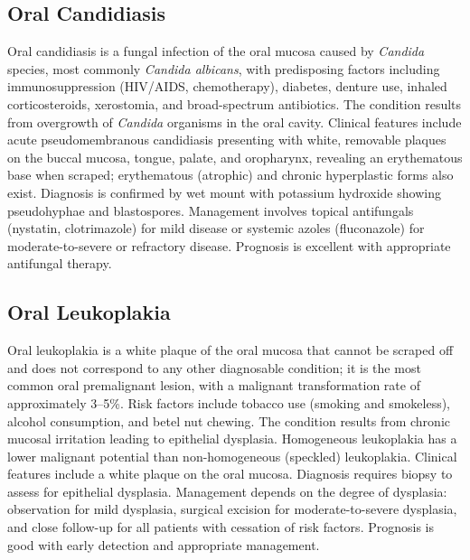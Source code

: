 \subsection{Oral Candidiasis}
\label{sec:Oral Candidiasis}
Oral candidiasis is a fungal infection of the oral mucosa caused by \textit{Candida} species, most commonly \textit{Candida albicans}, with predisposing factors including immunosuppression (HIV/AIDS, chemotherapy), diabetes, denture use, inhaled corticosteroids, xerostomia, and broad-spectrum antibiotics. The condition results from overgrowth of \textit{Candida} organisms in the oral cavity. Clinical features include acute pseudomembranous candidiasis presenting with white, removable plaques on the buccal mucosa, tongue, palate, and oropharynx, revealing an erythematous base when scraped; erythematous (atrophic) and chronic hyperplastic forms also exist. Diagnosis is confirmed by wet mount with potassium hydroxide showing pseudohyphae and blastospores. Management involves topical antifungals (nystatin, clotrimazole) for mild disease or systemic azoles (fluconazole) for moderate-to-severe or refractory disease. Prognosis is excellent with appropriate antifungal therapy.

\subsection{Oral Leukoplakia}
\label{sec:Oral Leukoplakia}
Oral leukoplakia is a white plaque of the oral mucosa that cannot be scraped off and does not correspond to any other diagnosable condition; it is the most common oral premalignant lesion, with a malignant transformation rate of approximately 3--5\%. Risk factors include tobacco use (smoking and smokeless), alcohol consumption, and betel nut chewing. The condition results from chronic mucosal irritation leading to epithelial dysplasia. Homogeneous leukoplakia has a lower malignant potential than non-homogeneous (speckled) leukoplakia. Clinical features include a white plaque on the oral mucosa. Diagnosis requires biopsy to assess for epithelial dysplasia. Management depends on the degree of dysplasia: observation for mild dysplasia, surgical excision for moderate-to-severe dysplasia, and close follow-up for all patients with cessation of risk factors. Prognosis is good with early detection and appropriate management.

